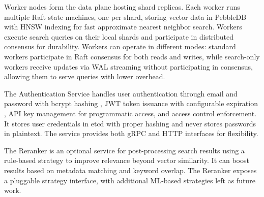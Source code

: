 \documentclass[conference]{IEEEtran}
\begin{document}
Worker nodes form the data plane hosting shard replicas. Each worker runs multiple Raft state machines, one per shard, storing vector data in PebbleDB with HNSW indexing for fast approximate nearest neighbor search. Workers execute search queries on their local shards and participate in distributed consensus for durability. Workers can operate in different modes: standard workers participate in Raft consensus for both reads and writes, while search-only workers receive updates via WAL streaming without participating in consensus, allowing them to serve queries with lower overhead.

The Authentication Service handles user authentication through email and password with bcrypt hashing \cite{bcrypt}, JWT token issuance with configurable expiration \cite{jwt}, API key management for programmatic access, and access control enforcement. It stores user credentials in etcd \cite{etcd} with proper hashing and never stores passwords in plaintext. The service provides both gRPC and HTTP interfaces for flexibility.

The Reranker is an optional service for post-processing search results using a rule-based strategy to improve relevance beyond vector similarity. It can boost results based on metadata matching and keyword overlap. The Reranker exposes a pluggable strategy interface, with additional ML-based strategies left as future work.
\end{document}
